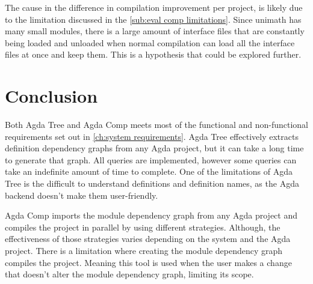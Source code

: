 The cause in the difference in compilation improvement per project, is likely
due to the limitation discussed in the \cref{sub:eval comp limitations}. Since
unimath has many small modules, there is a large amount of interface files that
are constantly being loaded and unloaded when normal compilation can load all
the interface files at once and keep them. This is a hypothesis that could be
explored further.

\section{Conclusion}

Both Agda Tree and Agda Comp meets most of the functional and non-functional
requirements set out in \cref{ch:system requirements}. Agda Tree effectively
extracts definition dependency graphs from any Agda project, but it can take a
long time to generate that graph. All queries are implemented, however some
queries can take an indefinite amount of time to complete. One of the
limitations of Agda Tree is the difficult to understand definitions and
definition names, as the Agda backend doesn't make them user-friendly.

Agda Comp imports the module dependency graph from any Agda project and
compiles the project in parallel by using different strategies. Although, the
effectiveness of those strategies varies depending on the system and the Agda
project. There is a limitation where creating the module dependency graph
compiles the project. Meaning this tool is used when the user makes a change
that doesn't alter the module dependency graph, limiting its scope.




